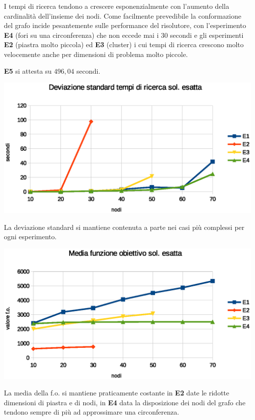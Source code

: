 \documentclass[a4paper]{article}
\begin{document}
                I tempi di ricerca tendono a crescere esponenzialmente con l'aumento della cardinalit\`a dell'insieme dei nodi.
                Come facilmente prevedibile la conformazione del grafo incide pesantemente sulle performance del risolutore, con l'esperimento \textbf{E4} (fori su una circonferenza) che non eccede
                mai i 30 secondi e gli esperimenti \textbf{E2} (piastra molto piccola) ed \textbf{E3} (cluster) i cui tempi di ricerca crescono molto velocemente anche per dimensioni di problema molto piccole.


                \textbf{E5} si attesta su $496,04$ secondi.

                \includegraphics[scale=0.7]{img/exadevtime}

                La deviazione standard si mantiene contenuta a parte nei casi pi\`u complessi per ogni esperimento.

                \includegraphics[scale=0.7]{img/exavgobj}

                
                La media della f.o. si mantiene praticamente costante in \textbf{E2} date le ridotte dimensioni di piastra e di nodi, in \textbf{E4} data la disposizione dei nodi del grafo che tendono sempre di pi\`u ad
                approssimare una circonferenza.
\end{document}
